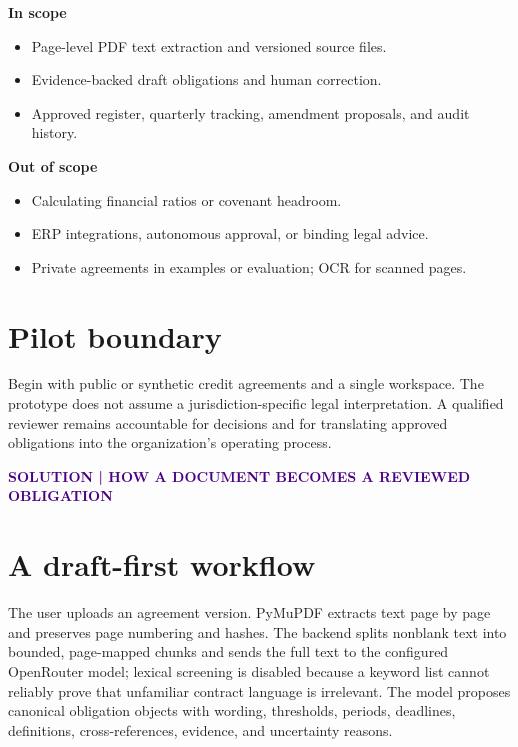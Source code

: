 \documentclass[10pt]{article}
\newcommand{\eyebrow}[1]{\textcolor{indigo}{\small\bfseries\MakeUppercase{#1}}}
\begin{document}
\begin{minipage}[t]{0.48\linewidth}
\textbf{In scope}
\begin{itemize}
  \item Page-level PDF text extraction and versioned source files.
  \item Evidence-backed draft obligations and human correction.
  \item Approved register, quarterly tracking, amendment proposals, and audit history.
\end{itemize}
\end{minipage}\hfill
\begin{minipage}[t]{0.48\linewidth}
\textbf{Out of scope}
\begin{itemize}
  \item Calculating financial ratios or covenant headroom.
  \item ERP integrations, autonomous approval, or binding legal advice.
  \item Private agreements in examples or evaluation; OCR for scanned pages.
\end{itemize}
\end{minipage}

\section{Pilot boundary}
Begin with public or synthetic credit agreements and a single workspace. The prototype does not assume a jurisdiction-specific legal interpretation. A qualified reviewer remains accountable for decisions and for translating approved obligations into the organization's operating process.

\newpage
\eyebrow{Solution | How a document becomes a reviewed obligation}
\section{A draft-first workflow}
The user uploads an agreement version. PyMuPDF extracts text page by page and preserves page numbering and hashes. The backend splits nonblank text into bounded, page-mapped chunks and sends the full text to the configured OpenRouter model; lexical screening is disabled because a keyword list cannot reliably prove that unfamiliar contract language is irrelevant. The model proposes canonical obligation objects with wording, thresholds, periods, deadlines, definitions, cross-references, evidence, and uncertainty reasons.
\end{document}
